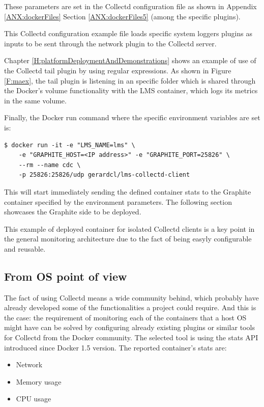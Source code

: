 These parameters are set in the Collectd configuration file as shown in Appendix \ref{ANX:dockerFiles} Section \ref{ANX:dockerFiles5} (among the specific plugins).

This Collectd configuration example file loads specific system loggers plugins as inputs to be sent through the network plugin to the Collectd server.

Chapter \ref{H:platformDeploymentAndDemonstrations} shows an example of use of the Collectd tail plugin by using regular expressions. As shown in Figure \ref{F:maex}, the tail plugin is listening in an specific folder which is shared through the Docker's volume functionality with the LMS container, which logs its metrics in the same volume.

Finally, the Docker run command where the specific environment variables are set is:
\begin{verbatim}
$ docker run -it -e "LMS_NAME=lms" \
	-e "GRAPHITE_HOST=<IP address>" -e "GRAPHITE_PORT=25826" \
	--rm --name cdc \
	-p 25826:25826/udp gerardcl/lms-collectd-client
\end{verbatim}

This will start immediately sending the defined container stats to the Graphite container specified by the environment parameters. The following section showcases the Graphite side to be deployed.

This example of deployed container for isolated Collectd clients is a key point in the general monitoring architecture due to the fact of being easyly configurable and reusable.

\subsection{From OS point of view}

The fact of using Collectd means a wide community behind, which probably have already developed some of the functionalities a project could require. And this is the case: the requirement of monitoring each of the containers that a host OS might have can be solved by configuring already existing plugins or similar tools for Collectd from the Docker community. The selected tool is using the stats API introduced since Docker 1.5 version. The reported container's stats are:
 
\begin{itemize}
\item Network
\item Memory usage
\item CPU usage
\end{itemize}

